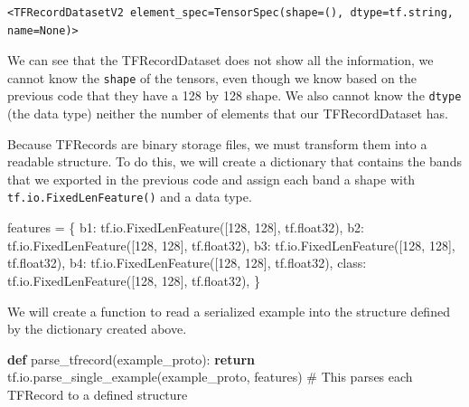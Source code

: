 \documentclass[
  letterpaper,
  DIV=11,
  numbers=noendperiod]{scrreprt}
\newenvironment{Shaded}{\begin{snugshade}}{\end{snugshade}}
\newcommand{\CommentTok}[1]{\textcolor[rgb]{0.37,0.37,0.37}{#1}}
\newcommand{\ControlFlowTok}[1]{\textcolor[rgb]{0.00,0.23,0.31}{\textbf{#1}}}
\newcommand{\DecValTok}[1]{\textcolor[rgb]{0.68,0.00,0.00}{#1}}
\newcommand{\KeywordTok}[1]{\textcolor[rgb]{0.00,0.23,0.31}{\textbf{#1}}}
\newcommand{\NormalTok}[1]{\textcolor[rgb]{0.00,0.23,0.31}{#1}}
\newcommand{\OperatorTok}[1]{\textcolor[rgb]{0.37,0.37,0.37}{#1}}
\newcommand{\StringTok}[1]{\textcolor[rgb]{0.13,0.47,0.30}{#1}}
\begin{document}
\begin{verbatim}
<TFRecordDatasetV2 element_spec=TensorSpec(shape=(), dtype=tf.string, name=None)>
\end{verbatim}

We can see that the TFRecordDataset does not show all the information,
we cannot know the \texttt{shape} of the tensors, even though we know
based on the previous code that they have a 128 by 128 shape. We also
cannot know the \texttt{dtype} (the data type) neither the number of
elements that our TFRecordDataset has.

Because TFRecords are binary storage files, we must transform them into
a readable structure. To do this, we will create a dictionary that
contains the bands that we exported in the previous code and assign each
band a shape with \texttt{tf.io.FixedLenFeature()} and a data type.

\begin{Shaded}
\begin{Highlighting}[]
\NormalTok{features }\OperatorTok{=}\NormalTok{ \{}
    \StringTok{\textquotesingle{}b1\textquotesingle{}}\NormalTok{: tf.io.FixedLenFeature([}\DecValTok{128}\NormalTok{, }\DecValTok{128}\NormalTok{], tf.float32),}
    \StringTok{\textquotesingle{}b2\textquotesingle{}}\NormalTok{: tf.io.FixedLenFeature([}\DecValTok{128}\NormalTok{, }\DecValTok{128}\NormalTok{], tf.float32),}
    \StringTok{\textquotesingle{}b3\textquotesingle{}}\NormalTok{: tf.io.FixedLenFeature([}\DecValTok{128}\NormalTok{, }\DecValTok{128}\NormalTok{], tf.float32),}
    \StringTok{\textquotesingle{}b4\textquotesingle{}}\NormalTok{: tf.io.FixedLenFeature([}\DecValTok{128}\NormalTok{, }\DecValTok{128}\NormalTok{], tf.float32),}
    \StringTok{\textquotesingle{}class\textquotesingle{}}\NormalTok{: tf.io.FixedLenFeature([}\DecValTok{128}\NormalTok{, }\DecValTok{128}\NormalTok{], tf.float32),}
\NormalTok{\}}
\end{Highlighting}
\end{Shaded}

We will create a function to read a serialized example into the
structure defined by the dictionary created above.

\begin{Shaded}
\begin{Highlighting}[]
\KeywordTok{def}\NormalTok{ parse\_tfrecord(example\_proto):}
    \ControlFlowTok{return}\NormalTok{ tf.io.parse\_single\_example(example\_proto, features) }\CommentTok{\# This parses each TFRecord to a defined structure}
\end{Highlighting}
\end{Shaded}
\end{document}
